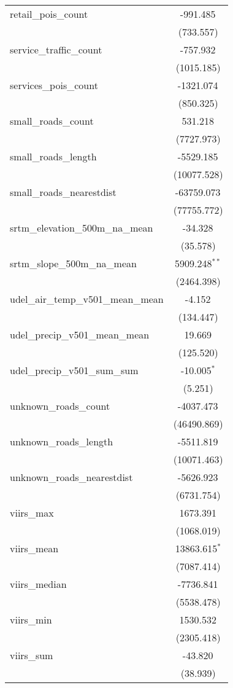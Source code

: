 \begin{table}[!htbp]
\begin{tabular}{@{\extracolsep{5pt}}lc}
 retail_pois_count & -991.485$^{}$ \\
  & (733.557) \\
 service_traffic_count & -757.932$^{}$ \\
  & (1015.185) \\
 services_pois_count & -1321.074$^{}$ \\
  & (850.325) \\
 small_roads_count & 531.218$^{}$ \\
  & (7727.973) \\
 small_roads_length & -5529.185$^{}$ \\
  & (10077.528) \\
 small_roads_nearestdist & -63759.073$^{}$ \\
  & (77755.772) \\
 srtm_elevation_500m_na_mean & -34.328$^{}$ \\
  & (35.578) \\
 srtm_slope_500m_na_mean & 5909.248$^{**}$ \\
  & (2464.398) \\
 udel_air_temp_v501_mean_mean & -4.152$^{}$ \\
  & (134.447) \\
 udel_precip_v501_mean_mean & 19.669$^{}$ \\
  & (125.520) \\
 udel_precip_v501_sum_sum & -10.005$^{*}$ \\
  & (5.251) \\
 unknown_roads_count & -4037.473$^{}$ \\
  & (46490.869) \\
 unknown_roads_length & -5511.819$^{}$ \\
  & (10071.463) \\
 unknown_roads_nearestdist & -5626.923$^{}$ \\
  & (6731.754) \\
 viirs_max & 1673.391$^{}$ \\
  & (1068.019) \\
 viirs_mean & 13863.615$^{*}$ \\
  & (7087.414) \\
 viirs_median & -7736.841$^{}$ \\
  & (5538.478) \\
 viirs_min & 1530.532$^{}$ \\
  & (2305.418) \\
 viirs_sum & -43.820$^{}$ \\
  & (38.939) \\

\end{tabular}
\end{table}
